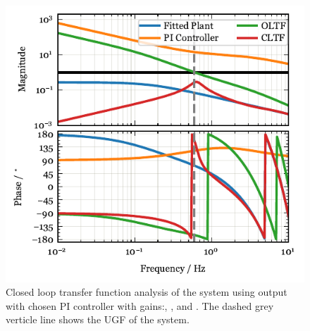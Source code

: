 \begin{figure}[!ht]
 \centering
 \includegraphics[width=\linewidth]{figures/Afrac_LoopStability.pdf}
 \caption{
Closed loop transfer function analysis of the system  using \Afrac output with chosen PI controller with gains:\AfracKp, \AfracTi, and \Afracstau.
The dashed grey verticle line shows the \ac{UGF} of the system.}
\label{fig:cltf_afrac}
\end{figure}